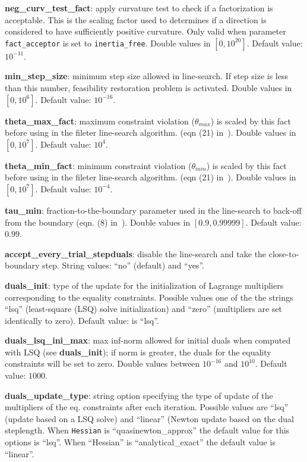 \noindent \textbf{neg\_curv\_test\_fact}: apply curvature test to check if a factorization is acceptable. This is the scaling factor used to determines if a direction is considered to have sufficiently positive curvature. Only valid when parameter \texttt{fact\_acceptor} is set to \texttt{inertia\_free}. Double values in $[0, 10^{20}]$. Default value: $10^{-11}$.
\medskip

\noindent \textbf{min\_step\_size}: minimum step size allowed in line-search. If step size is less than this number, feasibility restoration problem is activated. Double values in $[0, 10^{6}]$. Default value: $10^{-16}$.
\medskip
 
\noindent \textbf{theta\_max\_fact}: maximum constraint violation ($\theta_{max}$) is scaled by this fact before using in the fileter line-search algorithm. (eqn (21) in~\cite{waecther_05_ipopt0}). Double values in $[0, 10^7]$. Default value: $10^{4}$.
\medskip

\noindent \textbf{theta\_min\_fact}: minimum constraint violation ($\theta_{min}$) is scaled by this fact before using in the fileter line-search algorithm. (eqn (21) in~\cite{waecther_05_ipopt0}). Double values in $[0, 10^7]$. Default value: $10^{-4}$.
\medskip

\noindent \textbf{tau\_min}: fraction-to-the-boundary parameter used in the line-search to back-off from the boundary (eqn. (8) in~\cite{waecther_05_ipopt0}). Double values in $[0.9, 0.99999]$. Default value: $0.99$. 
\medskip

\noindent \textbf{accept\_every\_trial\_stepduals}: disable the line-search and take the close-to-boundary step. String values: ``no'' (default) and ``yes''.
\medskip

\noindent \textbf{duals\_init}: type of the update for the initialization of Lagrange multipliers corresponding to the equality constraints. Possible values one of the the strings ``lsq'' (least-square (LSQ) solve initialization) and ``zero'' (multipliers are set identically to zero). Default value: is ``lsq''.
\medskip

\noindent \textbf{duals\_lsq\_ini\_max}: max inf-norm allowed for initial duals when computed with LSQ (see \textbf{duals\_init}); if norm is greater, the duals for the equality constraints will be set to zero. Double values between $10^{-16}$ and $10^{10}$. Default value: $1000$.
\medskip

\noindent \textbf{duals\_update\_type}: string option specifying the type of update of the multipliers of the eq. constraints after each iteration. Possible values are ``lsq'' (update based on a LSQ solve) and ``linear'' (Newton update based on the dual steplength. When \texttt{Hessian} is ``quasinewton\_approx'' the default value for this options is ``lsq''. When ``Hessian'' is ``analytical\_exact'' the default value is ``linear''.
\medskip

